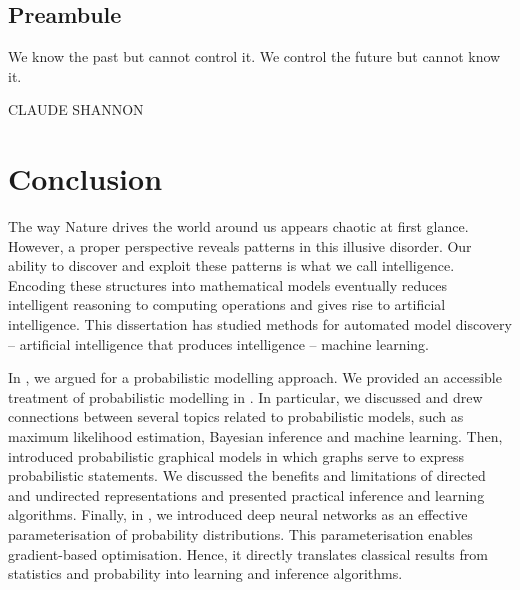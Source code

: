 \thispagestyle{empty}
\section*{Preambule}

\vfill

{\centering
\parbox{\textwidth}{%
  \raggedright
  {%

  We know the past but cannot control it. We control the future but cannot know it.\par\bigskip
  }
  \raggedleft\MakeUppercase{Claude Shannon}\par%
}}

\vfill\vfill


\chapter{Conclusion}\label{ch:08}
The way Nature drives the world around us appears chaotic at first glance. However, a proper perspective reveals patterns in this illusive disorder. Our ability to discover and exploit these patterns is what we call intelligence. Encoding these structures into mathematical models eventually reduces intelligent reasoning to computing operations and gives rise to artificial intelligence. This dissertation has studied methods for automated model discovery -- artificial intelligence that produces intelligence -- machine learning.

In , we argued for a probabilistic modelling approach. We provided an accessible treatment of probabilistic modelling in . In particular, we discussed and drew connections between several topics related to probabilistic models, such as maximum likelihood estimation, Bayesian inference and machine learning. Then,  introduced probabilistic graphical models in which graphs serve to express probabilistic statements. We discussed the benefits and limitations of directed and undirected representations and presented practical inference and learning algorithms. Finally, in , we introduced deep neural networks as an effective parameterisation of probability distributions. This parameterisation enables gradient-based optimisation. Hence, it directly translates classical results from statistics and probability into learning and inference algorithms.

